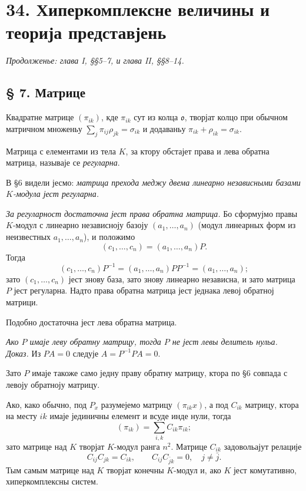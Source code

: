 ﻿\documentclass[11pt]{article}
\providecommand{\mo}{\mathfrak{o}}
\begin{document}
\setcounter{footnote}{12}
\section*{34. Хиперкомплексне величины и теорија представјень}
\emph{Продолженье: глава I, §§5--7, и глава II, §§8--14.}

\subsection*{§ 7. Матрице}

Квадратне матрице $(\pi_{ik})$, кде $\pi_{ik}$ сут из колца $\mo$, творјат колцо при обычном матричном множеньу $\sum_j \pi_{ij}\rho_{jk}=\sigma_{ik}$ и додаваньу $\pi_{ik}+\rho_{ik}=\sigma_{ik}$.

Матрица с елементами из тела $K$, за ктору обстајет права и лева обратна матрица, называје се \emph{регуларна}.

В §6 видели јесмо: \emph{матрица прехода меджу двема линеарно независными базами $K$-модула јест регуларна.}

\emph{За регуларност достаточна јест права обратна матрица.} Бо сформујмо правы $K$-модул с линеарно независноју базоју $(a_1,\ldots,a_n)$ (модул линеарных форм из неизвестных $a_1,\ldots,a_n$), и положимо
\[
        (c_1,\ldots,c_n)=(a_1,\ldots,a_n)P.
\]
Тогда
\[
        (c_1,\ldots,c_n)P^{-1}=(a_1,\ldots,a_n)PP^{-1}=(a_1,\ldots,a_n);
\]
зато $(c_1,\ldots,c_n)$ јест знову база, зато знову линеарно независна, и зато матрица $P$ јест регуларна. Надто права обратна матрица јест једнака левој обратној матрици.

Подобно достаточна јест лева обратна матрица.

\emph{Ако $P$ имаје леву обратну матрицу, тогда $P$ не јест левы делитель нульа.}
\emph{Доказ.} Из $PA=0$ следује $A=P^{-1}PA=0$.

Зато $P$ имаје такоже само једну праву обратну матрицу, ктора по §6 совпада с левоју обратноју матрицу.

Ако, како обычно, под $P_x$ разумејемо матрицу $(\pi_{ik}x)$, а под $C_{ik}$ матрицу, ктора на месту $ik$ имаје јединичны елемент и всуде инде нули, тогда
\[
        (\pi_{ik})=\sum_{i,k} C_{ik}\pi_{ik};
\]
зато матрице над $K$ творјат $K$-модул ранга $n^2$. Матрице $C_{ik}$ задовольајут релације
\[
        C_{ij}C_{jk}=C_{ik},
        \qquad
        C_{ij}C_{\bar j k}=0,\quad j\ne\bar j.
\]
Тым самым матрице над $K$ творјат конечны $K$-модул и, ако $K$ јест комутативно, хиперкомплексны систем.
\end{document}
